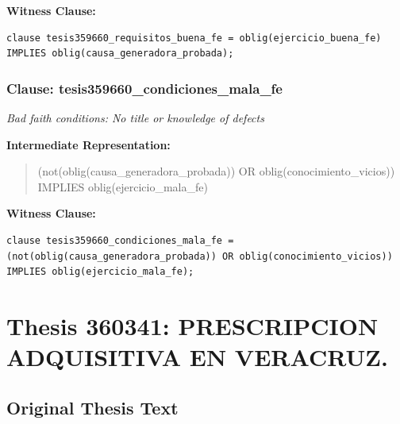 \documentclass[11pt,a4paper]{article}
\begin{document}
\textbf{Witness Clause:}

\begin{lstlisting}[style=witnessstyle, language=Witness]
clause tesis359660_requisitos_buena_fe = oblig(ejercicio_buena_fe) IMPLIES oblig(causa_generadora_probada);
\end{lstlisting}

\subsubsection{Clause: tesis359660\_condiciones\_mala\_fe}

\textit{Bad faith conditions: No title or knowledge of defects}

\textbf{Intermediate Representation:}

\begin{quote}
(not(oblig(causa\_generadora\_probada)) OR oblig(conocimiento\_vicios)) IMPLIES oblig(ejercicio\_mala\_fe)
\end{quote}

\textbf{Witness Clause:}

\begin{lstlisting}[style=witnessstyle, language=Witness]
clause tesis359660_condiciones_mala_fe = (not(oblig(causa_generadora_probada)) OR oblig(conocimiento_vicios)) IMPLIES oblig(ejercicio_mala_fe);
\end{lstlisting}

\newpage

\section{Thesis 360341: PRESCRIPCION ADQUISITIVA EN VERACRUZ.}
\label{thesis:360341}

\subsection{Original Thesis Text}
\end{document}
